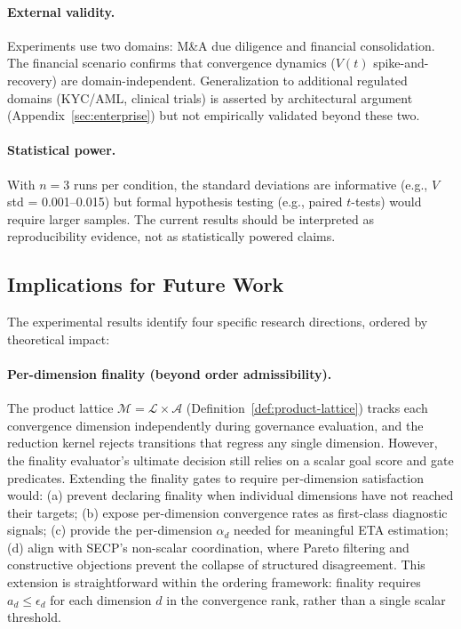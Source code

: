 \documentclass[11pt]{article}
\begin{document}
\paragraph{External validity.} Experiments use two domains: M\&A due diligence and financial consolidation. The financial scenario confirms that convergence dynamics ($V(t)$ spike-and-recovery) are domain-independent. Generalization to additional regulated domains (KYC/AML, clinical trials) is asserted by architectural argument (Appendix~\ref{sec:enterprise}) but not empirically validated beyond these two.

\paragraph{Statistical power.} With $n = 3$ runs per condition, the standard deviations are informative (e.g., $V$ std = 0.001--0.015) but formal hypothesis testing (e.g., paired $t$-tests) would require larger samples. The current results should be interpreted as reproducibility evidence, not as statistically powered claims.

\subsection{Implications for Future Work}

The experimental results identify four specific research directions, ordered by theoretical impact:

\paragraph{Per-dimension finality (beyond order admissibility).} The product lattice $\mathcal{M} = \mathcal{L} \times \mathcal{A}$ (Definition~\ref{def:product-lattice}) tracks each convergence dimension independently during governance evaluation, and the reduction kernel rejects transitions that regress any single dimension. However, the finality evaluator's ultimate decision still relies on a scalar goal score and gate predicates. Extending the finality gates to require per-dimension satisfaction would: (a) prevent declaring finality when individual dimensions have not reached their targets; (b) expose per-dimension convergence rates as first-class diagnostic signals; (c) provide the per-dimension $\alpha_d$ needed for meaningful ETA estimation; (d) align with SECP's non-scalar coordination, where Pareto filtering and constructive objections prevent the collapse of structured disagreement. This extension is straightforward within the ordering framework: finality requires $a_d \leq \epsilon_d$ for each dimension $d$ in the convergence rank, rather than a single scalar threshold.
\end{document}
